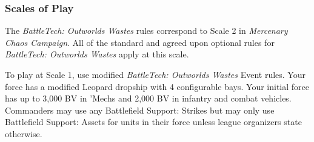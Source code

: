 \subsubsection{Scales of Play}

The \emph{BattleTech: Outworlds Wastes} rules correspond to Scale 2 in \emph{Mercenary Chaos Campaign}.
All of the standard and agreed upon optional rules for \emph{BattleTech: Outworlds Wastes} apply at this scale.

To play at Scale 1, use modified \emph{BattleTech: Outworlds Wastes} Event rules.
Your force has a modified Leopard dropship with 4 configurable bays.
Your initial force has up to 3,000 BV in 'Mechs and 2,000 BV in infantry and combat vehicles.
Commanders may use any Battlefield Support: Strikes but may only use Battlefield Support: Assets for units in their force unless league organizers state otherwise.
